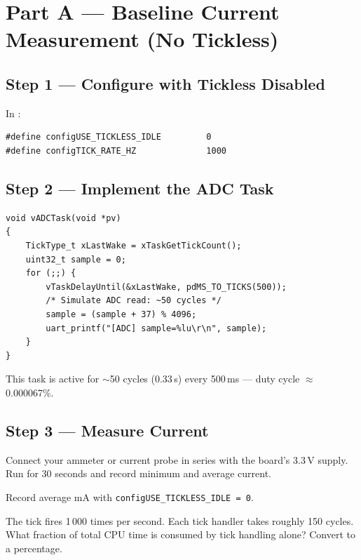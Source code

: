 \documentclass[11pt, a4paper]{article}
\begin{document}
\section{Part A --- Baseline Current Measurement (No Tickless)}

\subsection{Step 1 --- Configure with Tickless Disabled}

In :

\begin{lstlisting}[style=cstyle]
#define configUSE_TICKLESS_IDLE         0
#define configTICK_RATE_HZ              1000
\end{lstlisting}

\subsection{Step 2 --- Implement the ADC Task}

\begin{lstlisting}[style=cstyle]
void vADCTask(void *pv)
{
    TickType_t xLastWake = xTaskGetTickCount();
    uint32_t sample = 0;
    for (;;) {
        vTaskDelayUntil(&xLastWake, pdMS_TO_TICKS(500));
        /* Simulate ADC read: ~50 cycles */
        sample = (sample + 37) % 4096;
        uart_printf("[ADC] sample=%lu\r\n", sample);
    }
}
\end{lstlisting}

This task is active for $\sim$50 cycles (0.33\,\textmu s) every 500\,ms --- duty cycle
$\approx$ 0.000067\%.

\subsection{Step 3 --- Measure Current}

Connect your ammeter or current probe in series with the board's 3.3\,V supply. Run
for 30 seconds and record minimum and average current.

\begin{checkpointbox}[~A]
  Record average mA with \texttt{configUSE\_TICKLESS\_IDLE\,=\,0}.
\end{checkpointbox}

\begin{questionbox}[~A1]
  The tick fires 1\,000 times per second. Each tick handler takes roughly 150 cycles.
  What fraction of total CPU time is consumed by tick handling alone? Convert to a
  percentage.
\end{questionbox}
\end{document}
